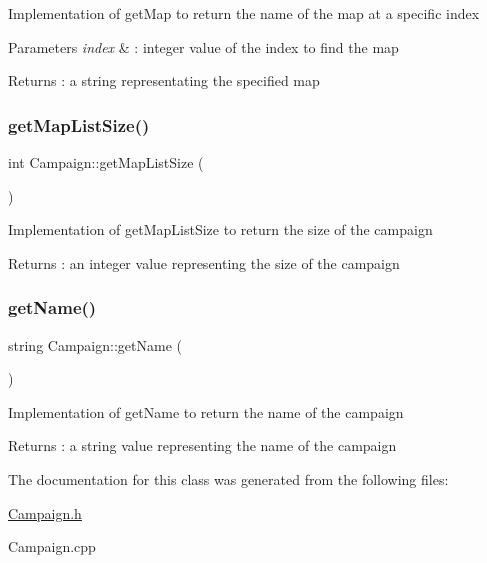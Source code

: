 Implementation of get\+Map to return the name of the map at a specific index 
\begin{DoxyParams}{Parameters}
{\em index} & \+: integer value of the index to find the map \\
\hline
\end{DoxyParams}
\begin{DoxyReturn}{Returns}
\+: a string representating the specified map 
\end{DoxyReturn}
\hypertarget{class_campaign_a0eff36282a94a37fd5860550d9f2a217}{}\label{class_campaign_a0eff36282a94a37fd5860550d9f2a217} 
\subsubsection{\texorpdfstring{get\+Map\+List\+Size()}{getMapListSize()}}
{\footnotesize\ttfamily int Campaign\+::get\+Map\+List\+Size (\begin{DoxyParamCaption}{ }\end{DoxyParamCaption})}

Implementation of get\+Map\+List\+Size to return the size of the campaign \begin{DoxyReturn}{Returns}
\+: an integer value representing the size of the campaign 
\end{DoxyReturn}
\hypertarget{class_campaign_a9813a6cab4db158847e83031db891b2a}{}\label{class_campaign_a9813a6cab4db158847e83031db891b2a} 
\subsubsection{\texorpdfstring{get\+Name()}{getName()}}
{\footnotesize\ttfamily string Campaign\+::get\+Name (\begin{DoxyParamCaption}{ }\end{DoxyParamCaption})}

Implementation of get\+Name to return the name of the campaign \begin{DoxyReturn}{Returns}
\+: a string value representing the name of the campaign 
\end{DoxyReturn}


The documentation for this class was generated from the following files\+:\begin{DoxyCompactItemize}
\item 
\hyperlink{_campaign_8h}{Campaign.\+h}\item 
Campaign.\+cpp\end{DoxyCompactItemize}
